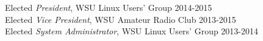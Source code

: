 \documentclass[line, margin]{res}
\begin{document}
\begin{resume}
\begin{position}
                \par
            Elected {\it President}, WSU Linux Users' Group \hfill 2014-2015\\
            Elected {\it Vice President}, WSU Amateur Radio Club \hfill 2013-2015\\
            Elected {\it System Administrator}, WSU Linux Users' Group \hfill 2013-2014\\

\end{position}
\end{resume}
\end{document}

